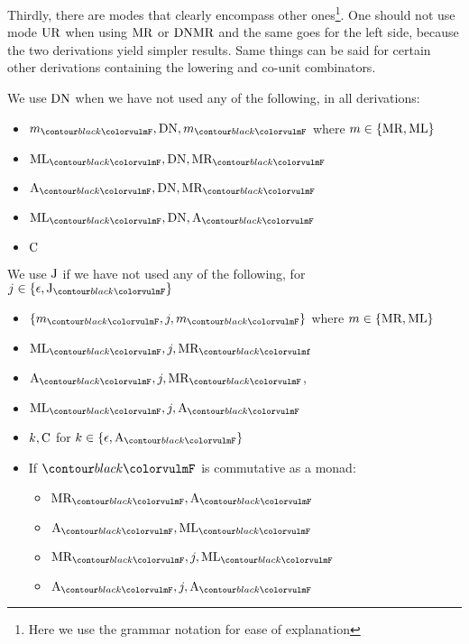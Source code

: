 \medskip

Thirdly, there are modes that clearly encompass other ones\footnote{Here we use
	the grammar notation for ease of explanation}.
One should not use mode $\text{UR}$ when using $\text{MR}$ or $\text{DN} \text{MR}$
and the same goes for the left side, because the two derivations yield simpler
results.
Same things can be said for certain other derivations containing the lowering
and co-unit combinators.

\noindent We use $\text{DN}$ when we have not used any of the following, in all
derivations:
\begin{multicols}{2}
	\begin{itemize}
		\item $m_{\f{F}}, \combDN, m_{\f{F}}$ where
		      $m \in \{\text{MR}, \text{ML}\}$
		\item $\combML_{\f{F}}, \combDN, \combMR_{\f{F}}$
		\item $\combA_{\f{F}}, \combDN, \combMR_{\f{F}}$
		\item $\combML_{\f{F}}, \combDN, \combA_{\f{F}}$
		\item $\text{C}$
	\end{itemize}
\end{multicols}
\noindent We use $\text{J}$ if we have not used any of the following,
for $j \in \{\epsilon, \combJ_{\f{F}}\}$
\begin{multicols}{2}
	\begin{itemize}
		\item $\left\{m_{\f{F}}, j, m_{\f{F}}\right\}$ where
		      $m \in \{\text{MR}, \text{ML}\}$
		\item $\combML_{\f{F}}, j, \combMR_{\f{f}}$
		\item $\combA_{\f{F}}, j, \combMR_{\f{F}}$,
		\item $\combML_{\f{F}}, j, \combA_{\f{F}}$
		\item $k, \text{C}$ for $k \in \{\epsilon, \combA_{\f{F}}\}$
		\item If $\f{F}$ is commutative as a monad:
		      \begin{itemize}
			      \item $\combMR_{\f{F}}, \combA_{\f{F}}$
			      \item $\combA_{\f{F}}, \combML_{\f{F}}$
			      \item $\combMR_{\f{F}}, j, \combML_{\f{F}}$
			      \item $\combA_{\f{F}}, j, \combA_{\f{F}}$
		      \end{itemize}
	\end{itemize}
\end{multicols}

